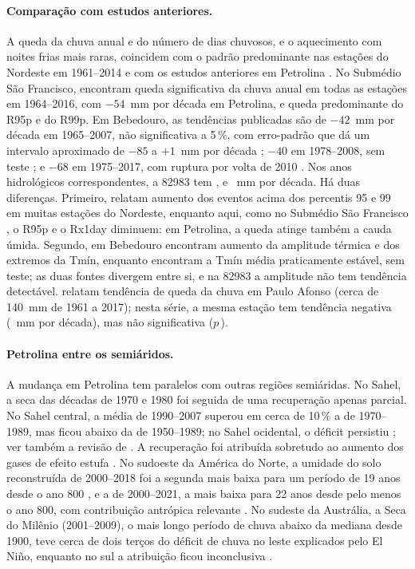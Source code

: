 \documentclass[11pt,a4paper]{article}
\newcommand{\Est}{82983}
\begin{document}
\paragraph{Comparação com estudos anteriores.} A queda da chuva anual e do número de dias
chuvosos, e o aquecimento com noites frias mais raras, coincidem com o padrão predominante nas
estações do Nordeste em 1961--2014 \parencite{costa2020} e com os estudos anteriores em Petrolina
\parencite{jatoba2017,pimentel2022}. No Submédio São Francisco, \textcite{assis2022} encontram queda
significativa da chuva anual em todas as estações em 1964--2016, com $-54$~mm por década em Petrolina, e
queda predominante do R95p e do R99p. Em Bebedouro, as tendências publicadas são de $-42$~mm por década
em 1965--2007, não significativa a 5\,\%, com erro-padrão que dá um intervalo aproximado de $-85$ a
$+1$~mm por década \parencite{lacerda2010}; $-40$ em 1978--2008, sem teste \parencite{teixeira2011}; e
$-68$ em 1975--2017, com ruptura por volta de 2010 \parencite{gois2024}. Nos anos hidrológicos
correspondentes, a \Est{} tem \SenEstLacerda{}, \SenEstTeixeira{} e \SenEstGois{}~mm por década. Há duas
diferenças. Primeiro, \textcite{costa2020} relatam aumento dos eventos acima dos percentis 95 e 99 em
muitas estações do Nordeste, enquanto aqui, como no Submédio São Francisco \parencite{assis2022}, o
R95p e o Rx1day diminuem: em Petrolina, a queda atinge também a cauda úmida. Segundo, em Bebedouro
\textcite{lacerda2010} encontram aumento da amplitude térmica e dos extremos da Tmín, enquanto
\textcite{teixeira2011} encontram a Tmín média praticamente estável, sem teste; as duas fontes divergem
entre si, e na \Est{} a amplitude não tem tendência detectável. \textcite{carvalho2020} relatam tendência
de queda da chuva em Paulo Afonso (cerca de 140~mm de 1961 a 2017); nesta série, a mesma estação tem tendência negativa
(\SenVizPauloAfonso{}~mm por década), mas não significativa ($p$\,\PVizPauloAfonso).

\paragraph{Petrolina entre os semiáridos.} A mudança em Petrolina tem paralelos com outras
regiões semiáridas. No Sahel, a seca das décadas de 1970 e 1980 foi seguida de uma recuperação
apenas parcial. No Sahel central, a média de 1990--2007 superou em cerca de 10\,\% a de 1970--1989,
mas ficou abaixo da de 1950--1989; no Sahel ocidental, o déficit persistiu \parencite{lebel2009}; ver
também a revisão de \textcite{nicholson2013}. A recuperação foi atribuída sobretudo ao aumento dos
gases de efeito estufa \parencite{dong2015}. No sudoeste da América do Norte, a umidade do solo
reconstruída de 2000--2018 foi a segunda mais baixa para um período de 19 anos desde o ano 800
\parencite{williams2020}, e a de 2000--2021, a mais baixa para 22 anos desde pelo menos o ano 800, com
contribuição antrópica relevante \parencite{williams2022}. No sudeste da Austrália, a Seca do Milênio
(2001--2009), o mais longo período de chuva abaixo da mediana desde 1900, teve cerca de dois terços do
déficit de chuva no leste explicados pelo El Niño, enquanto no sul a atribuição ficou inconclusiva
\parencite{vandijk2013}.
\end{document}
